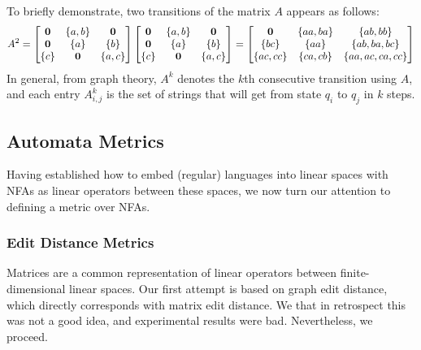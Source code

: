 \begin{example}
  To briefly demonstrate, two transitions of the matrix \(A\) appears as
  follows:
  \begin{align*}
    A^2 =
      \begin{bmatrix}
        \mathbf{0} & \left\{a, b\right\} & \mathbf{0} \\
        \mathbf{0} & \left\{a\right\} & \left\{b\right\} \\
        \left\{c\right\} & \mathbf{0} & \left\{a, c\right\}
      \end{bmatrix} 
      \begin{bmatrix}
        \mathbf{0} & \left\{a, b\right\} & \mathbf{0} \\
        \mathbf{0} & \left\{a\right\} & \left\{b\right\} \\
        \left\{c\right\} & \mathbf{0} & \left\{a, c\right\}
      \end{bmatrix}
      =
      \begin{bmatrix}
        \mathbf{0} & \left\{aa, ba\right\} & \left\{ab, bb\right\} \\
        \left\{bc\right\} & \left\{aa\right\} & \left\{ab, ba, bc\right\} \\
        \left\{ac, cc\right\} & \left\{ca, cb\right\} & \left\{aa, ac, ca, cc\right\}
      \end{bmatrix}
  \end{align*}
  In general, from graph theory, \(A^k\) denotes the \(k\)th consecutive
  transition using \(A\),
  and each entry \(A^k _{i, j}\) is the set of strings that will
  get from state \(q_i\) to \(q_j\) in \(k\) steps.

\end{example}


\subsection{Automata Metrics}

Having established how to embed (regular) languages into linear spaces
with NFAs as linear operators between these spaces,
we now turn our attention to defining a metric over NFAs.


\subsubsection{Edit Distance Metrics}
Matrices are a common representation of linear operators between
finite-dimensional linear spaces.
Our first attempt is based on graph edit distance,
which directly corresponds with matrix edit distance.
We that in retrospect this was not a good idea,
and experimental results were bad.
Nevertheless, we proceed.

